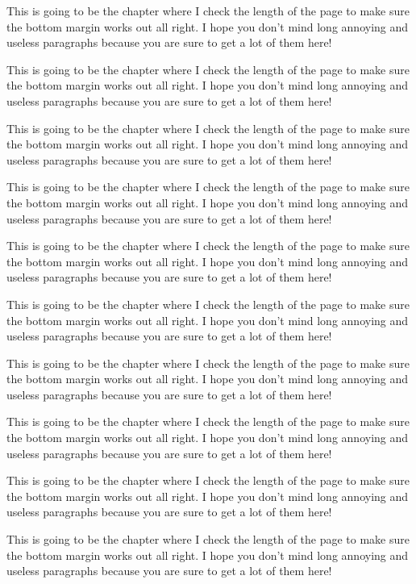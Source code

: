 This is going to be the chapter where I check the length of the page
to make sure the bottom margin works out all right.  I hope you don't
mind long annoying and useless paragraphs because you are sure to get
a lot of them here!

This is going to be the chapter where I check the length of the page
to make sure the bottom margin works out all right.  I hope you don't
mind long annoying and useless paragraphs because you are sure to get
a lot of them here!

This is going to be the chapter where I check the length of the page
to make sure the bottom margin works out all right.  I hope you don't
mind long annoying and useless paragraphs because you are sure to get
a lot of them here!

This is going to be the chapter where I check the length of the page
to make sure the bottom margin works out all right.  I hope you don't
mind long annoying and useless paragraphs because you are sure to get
a lot of them here!

This is going to be the chapter where I check the length of the page
to make sure the bottom margin works out all right.  I hope you don't
mind long annoying and useless paragraphs because you are sure to get
a lot of them here!

This is going to be the chapter where I check the length of the page
to make sure the bottom margin works out all right.  I hope you don't
mind long annoying and useless paragraphs because you are sure to get
a lot of them here!

This is going to be the chapter where I check the length of the page
to make sure the bottom margin works out all right.  I hope you don't
mind long annoying and useless paragraphs because you are sure to get
a lot of them here!

This is going to be the chapter where I check the length of the page
to make sure the bottom margin works out all right.  I hope you don't
mind long annoying and useless paragraphs because you are sure to get
a lot of them here!

This is going to be the chapter where I check the length of the page
to make sure the bottom margin works out all right.  I hope you don't
mind long annoying and useless paragraphs because you are sure to get
a lot of them here!

This is going to be the chapter where I check the length of the page
to make sure the bottom margin works out all right.  I hope you don't
mind long annoying and useless paragraphs because you are sure to get
a lot of them here!
